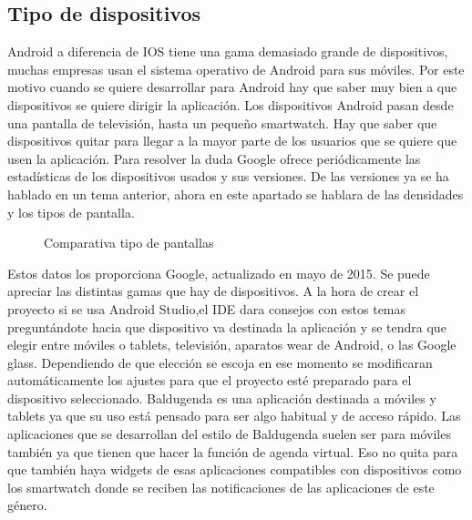 \subsection{Tipo de dispositivos}
\label{subsecc:Tipo de dispositivos}

Android a diferencia de IOS tiene una gama demasiado grande de dispositivos, muchas empresas usan el sistema operativo de Android para sus móviles.
Por este motivo cuando se quiere desarrollar para Android hay que saber muy bien a que dispositivos se quiere dirigir la aplicación.
Los dispositivos Android pasan desde una pantalla de televisión, hasta un pequeño smartwatch.
Hay que saber que dispositivos quitar para llegar a la mayor parte de los usuarios que se quiere que usen la aplicación.
Para resolver la duda Google ofrece periódicamente las estadísticas de los dispositivos usados y sus versiones.
De las versiones ya se ha hablado en un tema anterior, ahora en este apartado se hablara de las densidades y los tipos de pantalla.

\begin{figure}[H] 
  \begin{center} 
    \caption{Comparativa tipo de pantallas} 
    \label{fig:ComparativaPantallas} 
  \end{center} 
\end{figure}

Estos datos los proporciona Google, actualizado en mayo de 2015.
Se puede apreciar las distintas gamas que hay de dispositivos. A la hora de crear el proyecto si se usa Android Studio,el IDE dara consejos con estos temas preguntándote hacia que dispositivo va destinada la aplicación y se tendra  que elegir entre móviles o tablets, televisión, aparatos wear de Android, o las Google glass.
Dependiendo de que elección se escoja en ese momento se modificaran automáticamente los ajustes para que el proyecto esté preparado para el dispositivo seleccionado.
Baldugenda es una aplicación destinada a móviles y tablets ya que su uso está pensado para ser algo habitual y de acceso rápido.
Las aplicaciones que se desarrollan del estilo de Baldugenda suelen ser para móviles también ya que tienen que hacer la función de agenda virtual. Eso no quita para que también haya widgets de esas aplicaciones compatibles con dispositivos como los smartwatch donde se reciben las notificaciones de las aplicaciones de este género.

